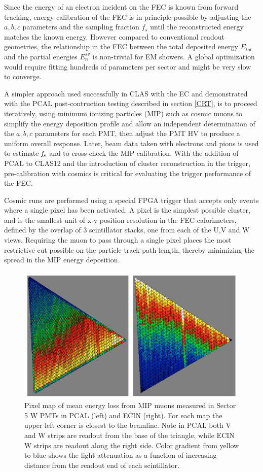 Since the energy of an electron incident on the FEC is known from forward tracking, energy calibration of the FEC is in principle possible by adjusting the $a,b,c$ parameters and the sampling fraction $f_{s}$ until the reconstructed energy matches the known energy.  However compared to conventional readout geometries, the relationship in the FEC between the total deposited energy $E_{tot}$ and the partial energies $E_{n}^{sv}$ is non-trivial for EM showers.  A global optimization would require fitting hundreds of parameters per sector and might be very slow to converge.

A simpler approach used successfully in CLAS with the EC and demonstrated with the PCAL post-contruction testing described in section \ref{CRT}, is to proceed iteratively, using minimum ionizing particles (MIP) such as cosmic muons to simplify the energy deposition profile and allow an independent determination of the $a,b,c$ parameters for each PMT, then adjust the PMT HV to produce a uniform overall response.  Later, beam data taken with electrons and pions is used to estimate $\it{f_s}$ and to cross-check the MIP calibration.  With the addition of PCAL to CLAS12 and the introduction of cluster reconstruction in the trigger, pre-calibration with cosmics is critical for evaluating the trigger performance of the FEC.

Cosmic runs are performed using a special FPGA trigger that accepts only events where a single pixel has been activated. A pixel is the simplest possible cluster, and is the smallest unit of x-y position resolution in the FEC calorimeters, defined by the overlap of 3 scintillator stacks, one from each of the U,V and W views.  Requiring the muon to pass through a single pixel places the most restrictive cut possible on the particle track path length, thereby minimizing the spread in the MIP energy deposition.   
\begin{figure}[hbt]
\centering
\includegraphics[width=1.0\columnwidth,keepaspectratio]{img/S9_1_1.png}
\caption[]{Pixel map of mean energy loss from MIP muons measured in Sector 5 W PMTs in PCAL (left) and ECIN (right). For each map the upper left corner is closest to the beamline. Note in PCAL both V and W strips are readout from the base of the triangle, while ECIN W strips are readout along the right side.  Color gradient from yellow to blue shows the light attenuation as a function of increasing distance from the readout end of each scintillator. }
\label{fig:S9_1_1}
\end{figure}

